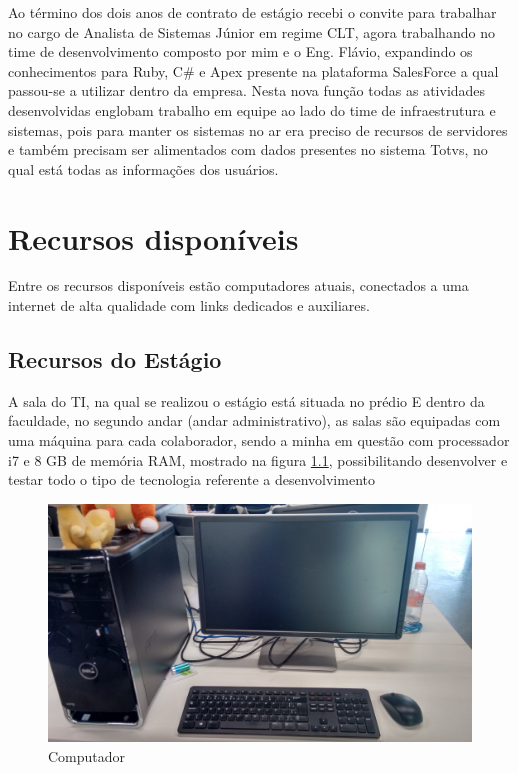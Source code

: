 \documentclass[
	12pt,				%
	oneside,			%
	a4paper,			%
	chapter=TITLE,		%
	section=TITLE,		%
	sumario=tradicional %
	english,			%
	french,				%
	spanish,			%
	brazil				%
	]{abntex2}
\begin{document}
Ao término dos dois anos de contrato de estágio recebi o convite para trabalhar no cargo de Analista de Sistemas Júnior em regime CLT, agora trabalhando no time de desenvolvimento composto por mim e o Eng. Flávio, expandindo os conhecimentos para Ruby, C\# e Apex presente na plataforma SalesForce a qual passou-se a utilizar dentro da empresa. Nesta nova função todas as atividades desenvolvidas englobam trabalho em equipe ao lado do time de infraestrutura e sistemas, pois para manter os sistemas no ar era preciso de recursos de servidores e também precisam ser alimentados com dados presentes no sistema Totvs, no qual está todas as informações dos usuários. 

\chapter{Recursos disponíveis}
\label{chap:chap4}
Entre os recursos disponíveis estão computadores atuais, conectados a uma internet de alta qualidade com links dedicados e auxiliares.

\section{Recursos do Estágio}
A sala do TI, na qual se realizou o estágio está situada no prédio E dentro da faculdade, no segundo andar (andar administrativo), as salas são equipadas com uma máquina para cada colaborador, sendo a minha em questão com processador i7 e 8 GB de memória RAM, mostrado na figura \ref{fig:pc}, possibilitando desenvolver e testar todo o tipo de tecnologia referente a desenvolvimento

\begin{figure}[htb]
	\caption{\label{fig:pc} Computador}
	\begin{center}
		\includegraphics[scale=0.1]{pc}
	\end{center}
\end{figure}
\end{document}
